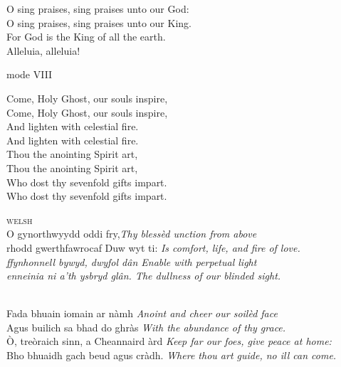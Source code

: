 {\begin{center}
O sing praises, sing praises unto our God:\\
O sing praises, sing praises unto our King.\\
For God is the King of all the earth. \\Alleluia, alleluia!

\end{center}
\vfill
\clearpage



\vfill

 {mode VIII}


\begin{center}
	
Come, Holy Ghost, our souls inspire,\\Come, Holy Ghost, our souls inspire,\\And lighten with celestial fire.\\
And lighten with celestial fire.\\
Thou the anointing Spirit art,\\
Thou the anointing Spirit art,\\
Who dost thy sevenfold gifts impart.\\
Who dost thy sevenfold gifts impart.\\
\end{center}
	
{\color{qred} \textsc{welsh}}\\
O gynorthwyydd oddi fry,\hfill\textit{Thy blessèd unction from above}\\
rhodd gwerthfawrocaf Duw wyt ti:
\hfill\itshape Is comfort, life, and fire of love.\normalfont\\
ffynhonnell bywyd, dwyfol dân
\hfill\itshape Enable with perpetual light\normalfont\\
enneinia ni a’th ysbryd glân.
\hfill\itshape The dullness of our blinded sight.

\\
Fada bhuain iomain ar nàmh
\hfill\textit{Anoint and cheer our soilèd face}\\
Agus builich sa bhad do ghràs
\hfill\textit{With the abundance of thy grace.}\\
Ò, treòraich sinn, a Cheannaird àrd
\hfill\textit{Keep far our foes, give peace at home:}
\\Bho bhuaidh gach beud agus cràdh.
\hfill\textit{Where thou art guide, no ill can come.}

}
